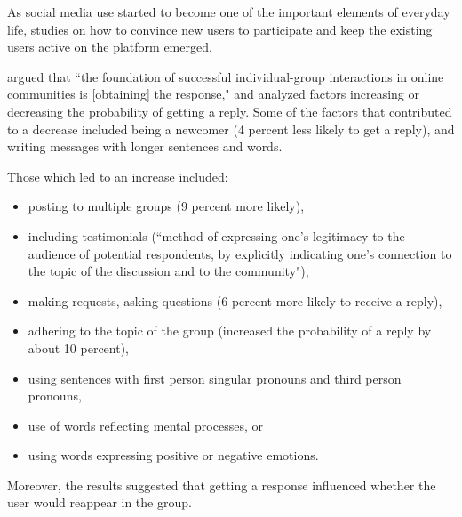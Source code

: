 \documentclass[a4paper,fleqn]{cas-dc}
\begin{document}
As social media use started to become one of the important elements of everyday life, studies on how to convince new users to participate and keep the existing users active on the platform emerged.

\citet{arguello2006talk} argued that ``the foundation of successful individual-group interactions in online communities is [obtaining] the response," and analyzed factors increasing or decreasing the probability of getting a reply. Some of the factors that contributed to a decrease included being a newcomer (4 percent less likely to get a reply), and writing messages with longer sentences and words.

Those which led to an increase included: 
\begin{itemize}
    \item posting to multiple groups (9 percent more likely), 
    \item including testimonials (``method of expressing one's legitimacy to the audience of potential respondents, by explicitly indicating one's connection to the topic of the discussion and to the community"), 
    \item making requests, asking questions (6 percent more likely to receive a reply),
    \item adhering to the topic of the group (increased the probability of a reply by about 10 percent),
    \item using sentences with first person singular pronouns and third person pronouns,
    \item use of words reflecting mental processes, or
    \item using words expressing positive or negative emotions.
\end{itemize}
Moreover, the results suggested that 
getting a response influenced whether the user would reappear in the group. 
\end{document}
